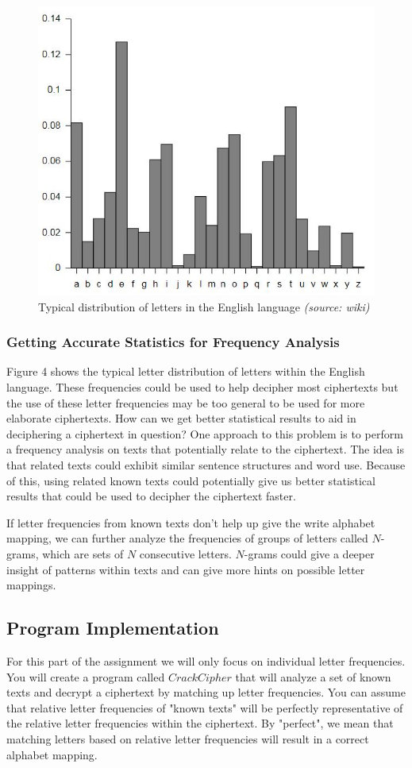 \documentclass{article}
\begin{document}
\begin{figure}[h!]
 \centering
  \includegraphics[width=.5\textwidth]{letterfrequency}
 \caption{Typical distribution of letters in the English language \textit{(source: wiki)}}
 \end{figure}

 \subsubsection*{Getting Accurate Statistics for Frequency Analysis}
Figure 4 shows the typical letter distribution of letters within the English language. These frequencies could be used to help decipher most ciphertexts but the use of these letter frequencies may be too general to be used for more elaborate ciphertexts. How can we get better statistical results to aid in deciphering a ciphertext in question? One approach to this problem is to perform a frequency analysis on texts that potentially relate to the ciphertext. The idea is that related texts could exhibit similar sentence structures and word use. Because of this, using related known texts could potentially give us better statistical results that could be used to decipher the ciphertext faster.

If letter frequencies from known texts don't help up give the write alphabet mapping, we can further analyze the frequencies of groups of letters called $N$-grams, which are sets of $N$ consecutive letters. $N$-grams could give a deeper insight of patterns within texts and can give more hints on possible letter mappings.


\subsection{Program Implementation}
For this part of the assignment we will only focus on individual letter frequencies. You will create a program called $CrackCipher$ that will analyze a set of known texts and decrypt a ciphertext by matching up letter frequencies. You can assume that relative letter frequencies of "known texts" will be perfectly representative of the relative letter frequencies within the ciphertext. By "perfect", we mean that matching letters based on relative letter frequencies will result in a correct alphabet mapping.\\
\end{document}
